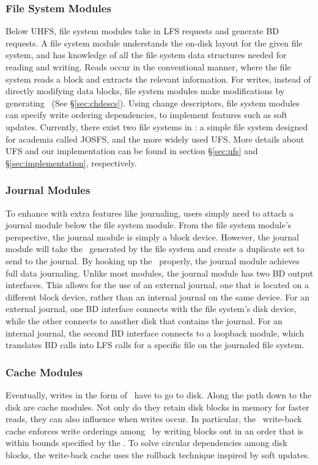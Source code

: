 \subsubsection{File System Modules}
\label{sec:modules:fs}
Below UHFS, file system modules take in LFS requests and generate BD requests.
A file system module understands the on-disk layout for the given file system,
and has knowledge of all the file system data structures needed for reading
and writing. Reads occur in the conventional manner, where the file system
reads a block and extracts the relevant information. For writes, instead of
directly modifying data blocks, file system modules make modifications by
generating \chdescs\ (See \S\ref{sec:chdescs}). Using change
descriptors, file system modules can specify write ordering dependencies,
to implement features such as soft updates.
Currently, there exist two file systems in \Kudos: a simple file system
designed for academia called JOSFS, and the more widely used UFS. More details
about UFS and our implementation can be found in section
\S\ref{sec:ufs} and \S\ref{sec:implementation}, respectively.

\subsubsection{Journal Modules}
\label{sec:modules:journal}
To enhance \Kudos with extra features like journaling, users simply need to
attach a journal module below the file system module. From the file system
module's perspective, the journal module is simply a block device. However,
the journal module will take the \chdescs\ generated by the file
system and create a duplicate set to send to the journal. By hooking up the
\chdescs\ properly, the journal module achieves full data journaling.
Unlike most modules, the journal module has two BD output interfaces. This
allows for the use of an external journal, one that is located on a different
block device, rather than an internal journal on the same device.
For an external journal, one BD interface connects with the file system's disk
device, while the other connects to another disk that contains the journal.
For an internal journal, the second BD interface connects to a loopback module,
which translates BD calls into LFS calls for a specific file on the journaled
file system.

\subsubsection{Cache Modules}
\label{sec:modules:cache}
Eventually, writes in the form of \chdescs\ have to go to disk. Along
the path down to the disk are cache modules. Not only do they retain disk
blocks in memory for faster reads, they can also influence when writes occur.
In particular, the \Kudos\ write-back cache enforces write orderings among
\chdescs\ by writing blocks out in an order that is within bounds
specified by the \chdescs. To solve circular dependencies among disk
blocks, the write-back cache uses the rollback technique inspired by soft
updates.

